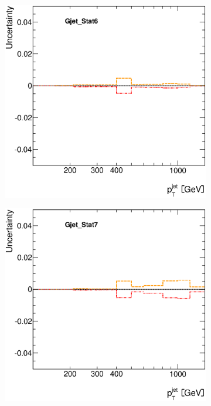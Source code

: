 \documentclass[12pt, twoside]{article}
\numberwithin{equation}{section}
\numberwithin{figure}{section}
\newenvironment{changemargin}[2]{%
\begin{list}{}{%
\setlength{\topsep}{0pt}%
\setlength{\leftmargin}{#1}%
\setlength{\rightmargin}{#2}%
\setlength{\listparindent}{\parindent}%
\setlength{\itemindent}{\parindent}%
\setlength{\parsep}{\parskip}%
}%
\item[]}{\end{list}}
\begin{document}
\begin{figure}[H]
\begin{changemargin}{-1.0cm}{-0.75cm}
\begin{changemargin}{-0.75cm}{-1.0cm}
\begin{subfigure}[b]{0.25\textwidth}
        \end{subfigure}
        \begin{subfigure}[b]{0.25\textwidth}
            \includegraphics[width=\textwidth]{./images/JetSystematics/JetSystematic-15.eps}
        \end{subfigure}
        \begin{subfigure}[b]{0.25\textwidth}
            \includegraphics[width=\textwidth]{./images/JetSystematics/JetSystematic-16.eps}
        \end{subfigure}


\end{changemargin}
\end{changemargin}
\end{figure}
\end{document}
